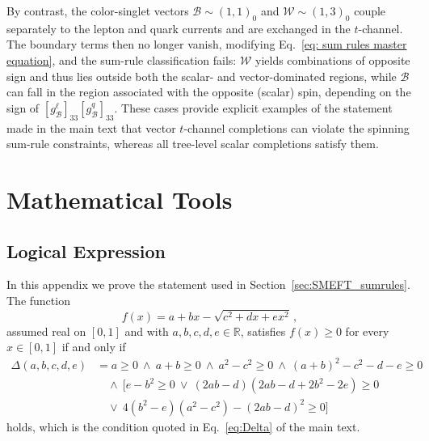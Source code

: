 \begin{subappendices}
By contrast, the color-singlet vectors $\mathcal{B} \sim (1,1)_0$ and
$\mathcal{W} \sim (1,3)_0$ couple separately to the lepton and quark currents and are exchanged in the $t$-channel. The boundary terms then no longer vanish, modifying Eq.~\eqref{eq: sum rules master equation}, and the sum-rule
classification fails: $\mathcal{W}$ yields combinations of opposite sign and thus
lies outside both the scalar- and vector-dominated regions, while $\mathcal{B}$ can
fall in the region associated with the opposite (scalar) spin, depending on the sign
of $[g_{\mathcal B}^\ell]_{33}[g_{\mathcal B}^q]_{33}$. These cases provide explicit
examples of the statement made in the main text that vector $t$-channel completions
can violate the spinning sum-rule constraints, whereas all tree-level scalar
completions satisfy them.

\section{Mathematical Tools\label{app:SMEFT_math}}

\subsection{Logical Expression}\label{sec:appendix, logical expression}

In this appendix we prove the statement used in Section~\ref{sec:SMEFT_sumrules}. The function
\begin{equation}
    f(x) = a + bx - \sqrt{c^2 + dx + ex^2}\,,
\end{equation}
assumed real on $[0,1]$ and with $a,b,c,d,e\in\mathbb{R}$, satisfies $f(x) \ge 0$ for every
$x \in [0,1]$ if and only if
\begin{align}
    \Delta(a,b,c,d,e) &= 
    a \ge 0 
    \ \land \
    a+b \ge 0
    \ \land \ 
    a^2 - c^2 \ge 0
    \ \land \ 
    (a+b)^2 - c^2 -d-e \ge 0 \nonumber
    \\& \quad
    \land \
    [e - b^2 \ge 0 \ \lor\  (2ab-d)(2ab-d+2b^2-2e) \ge 0 
    \nonumber \\& \quad
    \lor \ 4(b^2-e)(a^2-c^2)-(2ab-d)^2 \ge 0]
\end{align}
holds, which is the condition quoted in Eq.~\eqref{eq:Delta} of the main text.


\end{subappendices}
